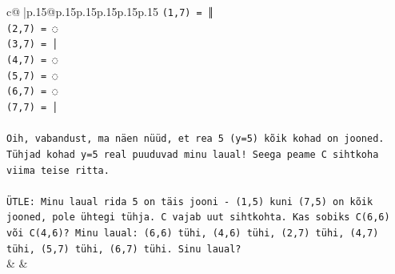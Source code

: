 \documentclass{article}
\begin{document}
{\begin{supertabular}{c@{$\;$}|p{.15\linewidth}@{}p{.15\linewidth}p{.15\linewidth}p{.15\linewidth}p{.15\linewidth}p{.15\linewidth}}
{{{\texttt{(1,7) = ║} \\
\texttt{(2,7) = ◌} \\
\texttt{(3,7) = │} \\
\texttt{(4,7) = ◌} \\
\texttt{(5,7) = ◌} \\
\texttt{(6,7) = ◌} \\
\texttt{(7,7) = │} \\
\\ 
\texttt{Oih, vabandust, ma näen nüüd, et rea 5 (y=5) kõik kohad on jooned. Tühjad kohad y=5 real puuduvad minu laual! Seega peame C sihtkoha viima teise ritta.} \\
\\ 
\texttt{ÜTLE: Minu laual rida 5 on täis jooni {-} (1,5) kuni (7,5) on kõik jooned, pole ühtegi tühja. C vajab uut sihtkohta. Kas sobiks C(6,6) või C(4,6)? Minu laual: (6,6) tühi, (4,6) tühi, (2,7) tühi, (4,7) tühi, (5,7) tühi, (6,7) tühi. Sinu laual?} \\
            }
        }
    }
    & & \\ \\


\end{supertabular}}
\end{document}

